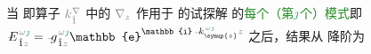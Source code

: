 当  即算子 $\mathcolor{gray}{k^\nabla_{\check{1}}}$ 中的 $\mathcolor{gray}{\nabla_z}$ 作用于  的试探解  的\textcolor{ForestGreen}{每个（第$\textcolor{ForestGreen}{\jmath}$个）模式}即 $
\Xint{\mathcolor{gray}{-}}{25}{E}^{\;\!\mathcolor{gray}{\omega} \textcolor{ForestGreen}{\jmath}}_{\;\! \hat{1} \mathcolor{gray}{z}} = \Xint{{}^{}_{\mathcolor{gray}{-}}}{10}{g}^{\;\!\mathcolor{gray}{\omega} \textcolor{ForestGreen}{\jmath}}_{\;\! \hat{1} \mathcolor{gray}{z}} \mathbb{e}^{\mathbb{i} \Xint{\begin{smallmatrix} ~ \\ {}^{}_{\mathcolor{gray}{-}} \\ ~ \end{smallmatrix}}{15}{k}_{\symup{z}}^{\;\! \mathcolor{gray}{\omega} \textcolor{ForestGreen}{\jmath}} \mathcolor{gray}{z}}$ 之后，结果从  降阶为
